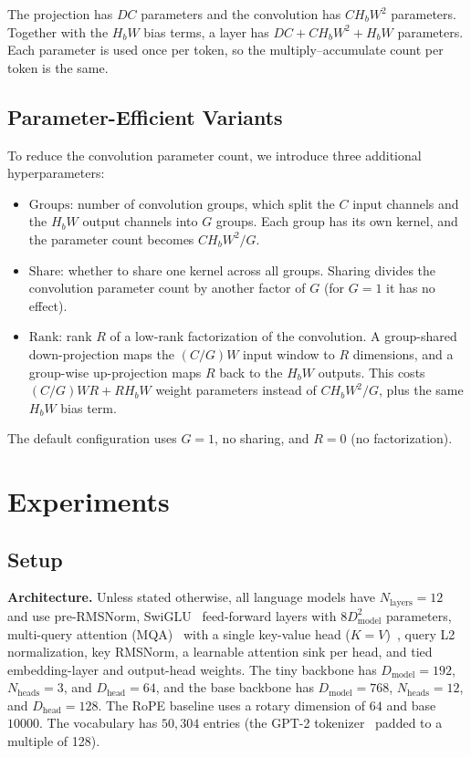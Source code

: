 \documentclass{article}
\begin{document}
The projection has $DC$ parameters and the convolution has $C H_b W^2$ parameters. Together with the $H_bW$ bias terms, a layer has $DC + C H_b W^2 + H_b W$ parameters. Each parameter is used once per token, so the multiply--accumulate count per token is the same.

\subsection{Parameter-Efficient Variants}

To reduce the convolution parameter count, we introduce three additional hyperparameters:
\begin{itemize}
    \item $\mathrm{Groups}$: number of convolution groups, which split the $C$ input channels and the $H_bW$ output channels into $G$ groups. Each group has its own kernel, and the parameter count becomes $C H_b W^2/G$.
    \item $\mathrm{Share}$: whether to share one kernel across all groups. Sharing divides the convolution parameter count by another factor of $G$ (for $G=1$ it has no effect).
    \item $\mathrm{Rank}$: rank $R$ of a low-rank factorization of the convolution. A group-shared down-projection maps the $(C/G)W$ input window to $R$ dimensions, and a group-wise up-projection maps $R$ back to the $H_bW$ outputs. This costs $(C/G)WR + R H_b W$ weight parameters instead of $C H_b W^2/G$, plus the same $H_bW$ bias term.
\end{itemize}
The default configuration uses $G=1$, no sharing, and $R=0$ (no factorization).

\section{Experiments}
\label{sec:experiments}

\subsection{Setup}
\label{sec:setup}

\textbf{Architecture.} Unless stated otherwise, all language models have $N_{\mathrm{layers}}=12$ and use pre-RMSNorm, SwiGLU~\cite{shazeer2020glu} feed-forward layers with $8D_{\mathrm{model}}^2$ parameters, multi-query attention (MQA)~\cite{shazeer2019fast} with a single key-value head ($K=V$)~\cite{deepseek2026v4}, query L2 normalization, key RMSNorm, a learnable attention sink per head, and tied embedding-layer and output-head weights. The tiny backbone has $D_{\mathrm{model}}=192$, $N_{\mathrm{heads}}=3$, and $D_{\mathrm{head}}=64$, and the base backbone has $D_{\mathrm{model}}=768$, $N_{\mathrm{heads}}=12$, and $D_{\mathrm{head}}=128$. The RoPE baseline uses a rotary dimension of $64$ and base $10000$. The vocabulary has $50{,}304$ entries (the GPT-2 tokenizer~\cite{radford2019language} padded to a multiple of 128).
\end{document}
